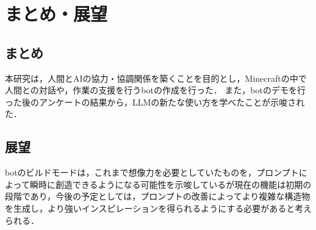 \chapter{まとめ・展望}	
\thispagestyle{plain}   %

\section{まとめ}
本研究は，人間とAIの協力・協調関係を築くことを目的とし，Minecraftの中で人間との対話や，作業の支援を行うbotの作成を行った．
また，botのデモを行った後のアンケートの結果から，LLMの新たな使い方を学べたことが示唆された．

\section{展望}
botのビルドモードは，これまで想像力を必要としていたものを，プロンプトによって瞬時に創造できるようになる可能性を示唆しているが現在の機能は初期の段階であり，今後の予定としては，プロンプトの改善によってより複雑な構造物を生成し，より強いインスピレーションを得られるようにする必要があると考えられる．